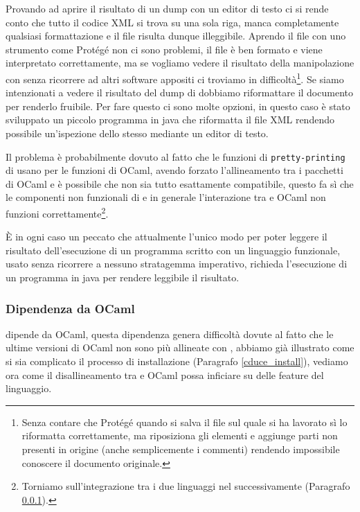Provando ad aprire il risultato di un dump con un editor di testo ci si rende conto che tutto il codice XML si trova su una sola riga, manca completamente qualsiasi formattazione e il file risulta dunque illeggibile. Aprendo il file con uno strumento come Protégé non ci sono problemi, il file è ben formato e viene interpretato correttamente, ma se vogliamo vedere il risultato della manipolazione con \cduce senza ricorrere ad altri software appositi ci troviamo in difficoltà\footnote{Senza contare che Protégé quando si salva il file sul quale si ha lavorato sì lo riformatta correttamente, ma riposiziona gli elementi e aggiunge parti non presenti in origine (anche semplicemente i commenti) rendendo impossibile conoscere il documento originale.}. Se siamo intenzionati a vedere il risultato del dump di \cduce dobbiamo riformattare il documento per renderlo fruibile. Per fare questo ci sono molte opzioni, in questo caso è stato sviluppato un piccolo programma in java che riformatta il file XML rendendo possibile un'ispezione dello stesso mediante un editor di testo. 

Il problema è probabilmente dovuto al fatto che le funzioni di \verb|pretty-printing| di \cduce usano per le funzioni di OCaml, avendo forzato l'allineamento tra i pacchetti di OCaml e \cduce è possibile che non sia tutto esattamente compatibile, questo fa sì che le componenti non funzionali di \cduce e in generale l'interazione tra \cduce e OCaml non funzioni correttamente\footnote{Torniamo sull'integrazione tra i due linguaggi nel successivamente (Paragrafo \ref{ocaml_depend}).}.

È in ogni caso un peccato che attualmente l'unico modo per poter leggere il risultato dell'esecuzione di un programma scritto con un linguaggio funzionale, usato senza ricorrere a nessuno stratagemma imperativo, richieda l'esecuzione di un programma in java per rendere leggibile il risultato.

\subsubsection{Dipendenza da OCaml}\label{ocaml_depend}
\cduce dipende da OCaml, questa dipendenza genera difficoltà dovute al fatto che le ultime versioni di OCaml non sono più allineate con \cduce, abbiamo già illustrato come si sia complicato il processo di installazione (Paragrafo \ref{cduce_install}), vediamo ora come il disallineamento tra \cduce e OCaml possa inficiare su delle feature del linguaggio.

